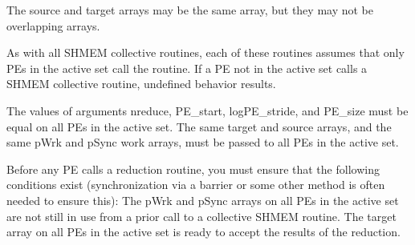 {{{ The source and target arrays may be the same array, but they may not be
 overlapping arrays.

 As with all SHMEM collective routines, each of these routines assumes
 that only PEs in the active set call the routine. If a PE not in the
 active set calls a SHMEM collective	 routine, undefined behavior
 results.

 
 The values of arguments nreduce, PE_start, logPE_stride, and PE_size
 must be equal on all PEs in the active set. The same target and source
 arrays, and the same pWrk and pSync work arrays, must be passed to all
 PEs in the active set.

 Before any PE	calls a reduction routine, you must ensure that the
 following conditions exist (synchronization via a barrier or some other
 method is often needed to ensure this): The pWrk and pSync arrays on
 all PEs in the active set are not still in use from a prior call	 to a
 collective SHMEM routine. The target array on all PEs in the active
 set is ready to accept the results of the reduction.

}}}
